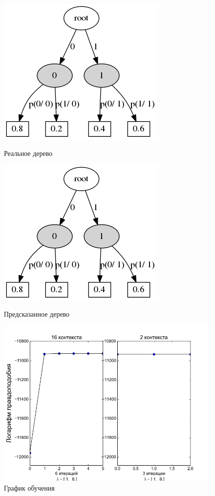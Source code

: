 \documentclass{matmex-diploma-custom}
\begin{document}
\begin{figure}[h!]\centering
\begin{minipage}[b]{0.49 \textwidth}
	\includegraphics[scale=0.4]{img/sample_hmm1/real_trie_.png}
	\centering
	\caption{ Реальное дерево }
	\label{fig:sample_hmm1_real_trie}
\end{minipage}
\hfil \hfil%
\begin{minipage}[b]{0.49 \textwidth}
	\includegraphics[scale=0.4]{img/sample_hmm1/predicted_trie.png}
	\centering
	\caption{ Предсказанное дерево }
	\label{fig:sample_hmm1_predicted_trie}
\end{minipage}
\begin{minipage}[b]{0.8 \textwidth}
	\includegraphics[scale=0.4]{img/sample_hmm1/plot_.png}
	\centering
	\caption{ График обучения }
	\label{fig:sample_hmm1_log_likelihood}
\end{minipage}
\end{figure}
\end{document}
